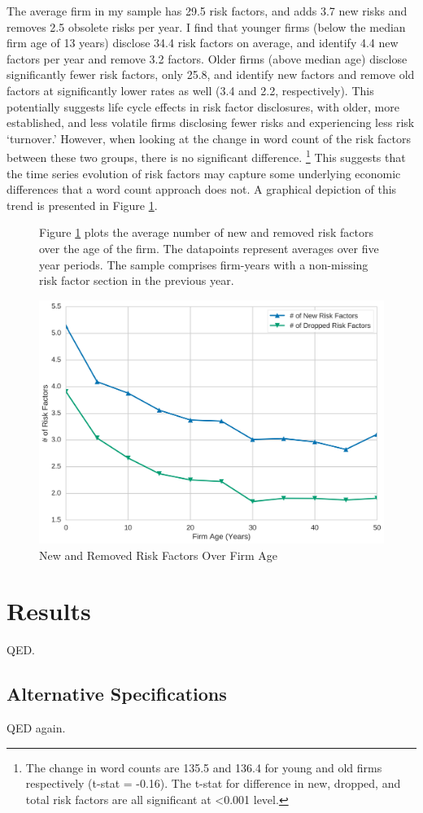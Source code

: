 The average firm in my sample has 29.5 risk factors, and adds 3.7 new risks and removes 2.5 obsolete risks per year.
I find that younger firms (below the median firm age of 13 years) disclose 34.4 risk factors on average, and identify 4.4 new factors per year and remove 3.2 factors.
Older firms (above median age) disclose significantly fewer risk factors, only 25.8, and identify new factors and remove old factors at significantly lower rates as well (3.4 and 2.2, respectively).
This potentially suggests life cycle effects in risk factor disclosures, with older, more established, and less volatile firms disclosing fewer risks and experiencing less risk `turnover.'
However, when looking at the change in word count of the risk factors between these two groups, there is no significant difference.%
\footnote{The change in word counts are 135.5 and 136.4 for young and old firms respectively (t-stat = -0.16). The t-stat for difference in new, dropped, and total risk factors are all significant at \textless 0.001 level.}
This suggests that the time series evolution of risk factors may capture some underlying economic differences that a word count approach does not.
A graphical depiction of this trend is presented in Figure \ref{fig:rf_ageseries}.


\begin{figure}[ht!]
	\caption{New and Removed Risk Factors Over Firm Age}
	\label{fig:rf_ageseries}
	
	Figure \ref{fig:rf_ageseries} plots the average number of new and removed risk factors over the age of the firm.
	The datapoints represent averages over five year periods.
	The sample comprises firm-years with a non-missing risk factor section in the previous year.
	
	\skipline
	\centering
	\includegraphics[scale=.5]{figures/add-drop_over_age.png}
\end{figure}




\section{Results}\label{sec:supply_result}

QED.




\subsection{Alternative Specifications}\label{sec:supply_robustness}

QED again.

